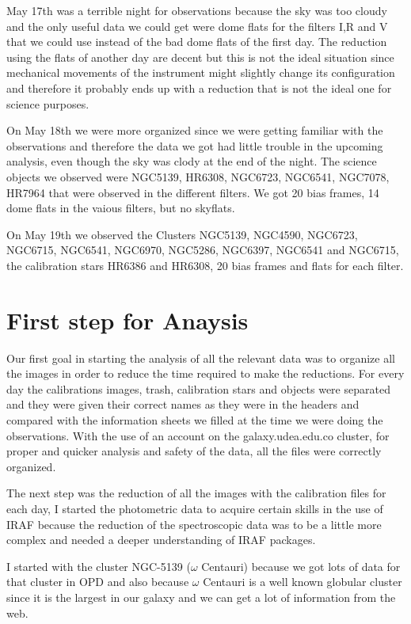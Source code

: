 May 17th was a terrible night for observations because the sky was too cloudy and the only useful data we could get were dome flats for the filters I,R and V that we could use instead of the bad dome flats of the first day. The reduction using the flats of another day are decent but this is not the ideal situation since mechanical movements of the instrument might slightly change its configuration and therefore it probably ends up with a reduction that is not the ideal one for science purposes.  

On May 18th we were more organized since we were getting familiar with the observations and therefore the data we got had little trouble in the upcoming analysis, even though the sky was clody at the end of the night. The science objects we observed were NGC5139, HR6308, NGC6723, NGC6541, NGC7078, HR7964 that were observed in the different filters. We got 20 bias frames, 14 dome flats in the vaious filters, but no skyflats. 

On May 19th we observed the Clusters NGC5139, NGC4590, NGC6723, NGC6715, NGC6541, NGC6970, NGC5286,    NGC6397, NGC6541 and NGC6715, the calibration stars HR6386 and HR6308, 20 bias frames and flats for each filter.

\section{First step for Anaysis}

Our first goal in starting the analysis of all the relevant data was to organize all the images in order to reduce the time required to make the reductions. For every day the calibrations images, trash, calibration stars and objects were separated and they were given their correct names as they were in the headers and compared with the information sheets we filled at the time we were doing the observations. With the use of an account on the galaxy.udea.edu.co cluster, for proper and quicker analysis and safety of the data, all the files were correctly organized.

The next step was the reduction of all the images with the calibration files for each day, I started the photometric data to acquire certain skills in the use of IRAF because the reduction of the spectroscopic data was to be a little more complex and needed a deeper understanding of IRAF packages. 

I started with the cluster NGC-5139 ($ \omega $ Centauri) because we got lots of data for that cluster in OPD and also because $ \omega $ Centauri is a well known globular cluster since it is the largest in our galaxy and we can get a lot of information from the web. 

